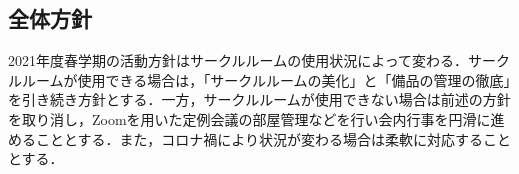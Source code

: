 \subsection*{全体方針}


2021年度春学期の活動方針はサークルルームの使用状況によって変わる．サークルルームが使用できる場合は，「サークルルームの美化」と「備品の管理の徹底」を引き続き方針とする．一方，サークルルームが使用できない場合は前述の方針を取り消し，Zoomを用いた定例会議の部屋管理などを行い会内行事を円滑に進めることとする．また，コロナ禍により状況が変わる場合は柔軟に対応することとする．
